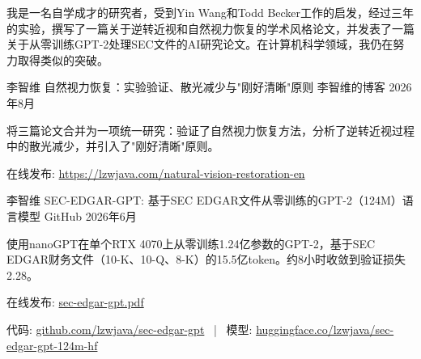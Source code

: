 
\begin{cvparagraph}
  我是一名自学成才的研究者，受到Yin Wang和Todd Becker工作的启发，经过三年的实验，撰写了一篇关于逆转近视和自然视力恢复的学术风格论文，并发表了一篇关于从零训练GPT-2处理SEC文件的AI研究论文。在计算机科学领域，我仍在努力取得类似的突破。\end{cvparagraph}

\begin{cventries}

  \cventry
    {李智维} %
    {自然视力恢复：实验验证、散光减少与"刚好清晰"原则} %
    {李智维的博客} %
    {2026年8月} %
    {
      \begin{cvitems}
        \item {将三篇论文合并为一项统一研究：验证了自然视力恢复方法，分析了逆转近视过程中的散光减少，并引入了"刚好清晰"原则。}
        \item {在线发布: \href{https://lzwjava.com/natural-vision-restoration-en}{https://lzwjava.com/natural-vision-restoration-en}}
      \end{cvitems}
    }

  \cventry
    {李智维} %
    {SEC-EDGAR-GPT: 基于SEC EDGAR文件从零训练的GPT-2（124M）语言模型} %
    {GitHub} %
    {2026年6月} %
    {
      \begin{cvitems}
        \item {使用nanoGPT在单个RTX 4070上从零训练1.24亿参数的GPT-2，基于SEC EDGAR财务文件（10-K、10-Q、8-K）的15.5亿token。约8小时收敛到验证损失2.28。}
        \item {在线发布: \href{https://github.com/lzwjava/sec-edgar-gpt/raw/main/sec-edgar-gpt.pdf}{sec-edgar-gpt.pdf}}
        \item {代码: \href{https://github.com/lzwjava/sec-edgar-gpt}{github.com/lzwjava/sec-edgar-gpt} \ | \ 模型: \href{https://huggingface.co/lzwjava/sec-edgar-gpt-124m-hf}{huggingface.co/lzwjava/sec-edgar-gpt-124m-hf}}
      \end{cvitems}
    }

\end{cventries}
